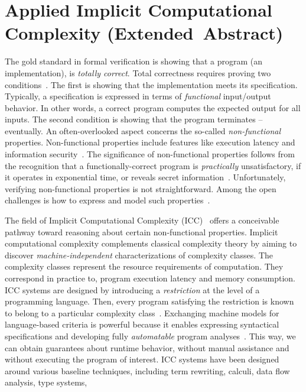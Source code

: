 \section{Applied Implicit Computational Complexity \mbox{(Extended Abstract)}}

The gold standard in formal verification is showing that a program (\ie an implementation), is \emph{totally correct}.
Total correctness requires proving two conditions~\cite{leino2023}.
The first is showing that the implementation meets its specification.
Typically, a specification is expressed in terms of \emph{functional} input/output behavior.
In other words, a correct program computes the expected output for all inputs.
The second condition is showing that the program terminates -- {eventually}.
An often-overlooked aspect concerns the so-called \emph{non-functional} properties.
Non-functional properties include features like execution latency and information security~\cite{terbeek2018}.
The significance of non-functional properties follows from the recognition that a functionally-correct program is \emph{practically} unsatisfactory, if it operates in exponential time, or reveals secret information~\cite{heraud2011,aubert20222}.
Unfortunately, verifying non-functional properties is not straightforward.
Among the open challenges is how to express and model such properties~\cite{etaps2025}.

The field of {Implicit Computational Complexity (ICC)}~\cite{dallago2011} offers a conceivable pathway toward reasoning about certain non-functional properties.
Implicit computational complexity complements classical complexity theory by aiming to discover \emph{machine-independent} characterizations of complexity classes.
The complexity classes represent the resource requirements of computation.
They correspond in practice to, \eg program execution latency and memory consumption.
ICC systems are designed by introducing a \emph{restriction} at the level of a programming language.
Then, every program satisfying the restriction is known to belong to a particular complexity class~\cite{pchoux2020}.
Exchanging machine models for language-based criteria is powerful because it enables expressing syntactical specifications and developing fully \emph{automatable} program analyses~\cite{heraud2011}.
This way, we can obtain {guarantees} about runtime behavior, without manual assistance and without executing the program of interest.
ICC systems have been designed around various baseline techniques, including term rewriting, calculi, data flow analysis, type systems, \etc~\cite{baillot2012,moyen2017}

